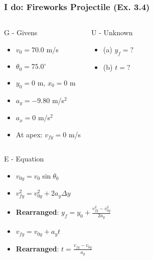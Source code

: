 \documentclass{beamer}
\begin{document}
\begin{frame}
\frametitle{I do: Fireworks Projectile (Ex. 3.4)}

\pause
\begin{columns}[T]
\begin{block}{G - Givens}
\begin{itemize}
\item $v_0 = 70.0$ m/s
\item $\theta_0 = 75.0^\circ$
\item $y_0 = 0$ m, $x_0 = 0$ m
\item $a_y = -9.80$ m/s$^2$
\item $a_x = 0$ m/s$^2$
\item At apex: $v_{fy} = 0$ m/s
\end{itemize}
\end{block}
\pause
{}
\begin{block}{U - Unknown}
\begin{itemize}
\item (a) $y_f = ?$
\item (b) $t = ?$
\end{itemize}
\end{block}
\end{columns}
\pause
\begin{columns}[T]
\begin{block}{E - Equation}
\begin{itemize}
\item $v_{0y} = v_0 \sin\theta_0$
\item $v_{fy}^2 = v_{0y}^2 + 2a_y\Delta y$
\item \textbf{Rearranged}: $y_f = y_0 + \frac{v_{fy}^2 - v_{0y}^2}{2a_y}$
\item $v_{fy} = v_{0y} + a_y t$
\item \textbf{Rearranged}: $t = \frac{v_{fy} - v_{0y}}{a_y}$
\end{itemize}
\end{block}
\end{columns}
\end{frame}
\end{document}
